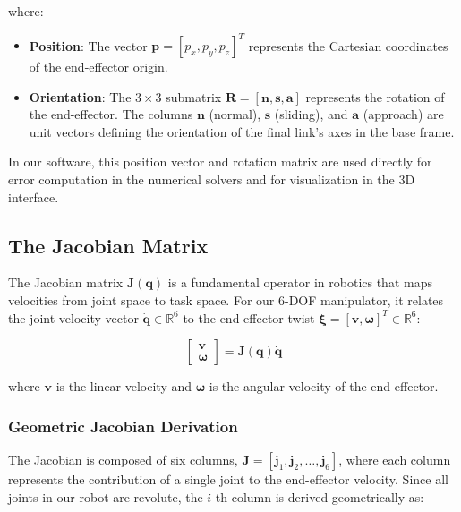 \documentclass[12pt,a4paper]{report}
\begin{document}
where:
\begin{itemize}
    \item \textbf{Position}: The vector $\mathbf{p} = [p_x, p_y, p_z]^T$ represents the Cartesian coordinates of the end-effector origin.
    \item \textbf{Orientation}: The $3 \times 3$ submatrix $\mathbf{R} = [\mathbf{n}, \mathbf{s}, \mathbf{a}]$ represents the rotation of the end-effector. The columns $\mathbf{n}$ (normal), $\mathbf{s}$ (sliding), and $\mathbf{a}$ (approach) are unit vectors defining the orientation of the final link's axes in the base frame.
\end{itemize}

In our software, this position vector and rotation matrix are used directly for error computation in the numerical solvers and for visualization in the 3D interface.

\subsection{The Jacobian Matrix}

The Jacobian matrix $\mathbf{J}(\mathbf{q})$ is a fundamental operator in robotics that maps velocities from joint space to task space. For our 6-DOF manipulator, it relates the joint velocity vector $\dot{\mathbf{q}} \in \mathbb{R}^6$ to the end-effector twist $\mathbf{\xi} = [\mathbf{v}, \mathbf{\omega}]^T \in \mathbb{R}^6$:

\begin{equation}
    \begin{bmatrix} \mathbf{v} \\ \mathbf{\omega} \end{bmatrix} = \mathbf{J}(\mathbf{q}) \dot{\mathbf{q}}
\end{equation}

where $\mathbf{v}$ is the linear velocity and $\mathbf{\omega}$ is the angular velocity of the end-effector.

\subsubsection{Geometric Jacobian Derivation}

The Jacobian is composed of six columns, $\mathbf{J} = [\mathbf{j}_1, \mathbf{j}_2, \dots, \mathbf{j}_6]$, where each column represents the contribution of a single joint to the end-effector velocity. Since all joints in our robot are revolute, the $i$-th column is derived geometrically as:
\end{document}
